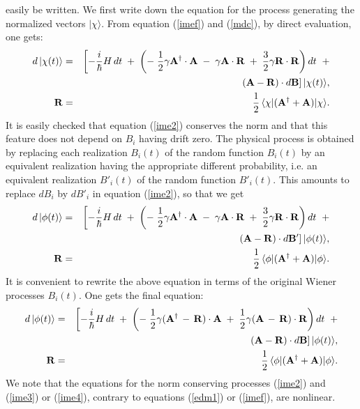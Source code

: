 \documentclass[12pt]{article}
\begin{document}
easily be written. We first write down the equation for the
process generating the normalized vectors $| \chi\rangle$. From
equation (\ref{imef}) and (\ref{mdc}), by direct evaluation, one
gets:
\begin{eqnarray} \label{ime2}
d\, |\chi(t)\rangle & = & \left[ -\frac{i}{\hbar} H\, dt \; + \;
\left( - \; \frac{1}{2}\gamma {\bf A}^{\dagger}\cdot {\bf A} \; -
\; \gamma {\bf A}\cdot {\bf R} \; + \; \frac{3}{2} \gamma {\bf R}
\cdot {\bf R} \right) dt \right. \; + \nonumber \\
&  & \left. ( {\bf A} - {\bf R})\cdot d{\bf B} \right]
|\chi(t)\rangle, \\
{\bf R} & = & \frac{1}{2}\, \langle \chi|({\bf A}^{\dagger} + {\bf
A}) |\chi \rangle. \nonumber
\end{eqnarray}
It is easily checked that equation (\ref{ime2}) conserves the norm
and that this feature does not depend on $B_{i}$ having drift
zero. The physical process is obtained by replacing each
realization $B_{i}(t)$ of the random function $B_{i}(t)$ by an
equivalent realization having the appropriate different
probability, i.e. an equivalent realization $B'_{i}(t)$ of the
random function $B'_{i}(t)$. This amounts to replace $dB_{i}$ by
$dB'_{i}$ in equation (\ref{ime2}), so that we get
\begin{eqnarray} \label{ime3}
d\, |\phi(t)\rangle & = & \left[ -\frac{i}{\hbar} H\, dt \; + \;
\left( - \; \frac{1}{2}\gamma {\bf A}^{\dagger}\cdot {\bf A} \; -
\; \gamma {\bf A}\cdot {\bf R} \; + \; \frac{3}{2} \gamma {\bf R}
\cdot {\bf R} \right) dt \right. \; + \nonumber \\
&  & \left. ( {\bf A} - {\bf R})\cdot d{\bf B}' \right]
|\phi(t)\rangle, \\
{\bf R} & = & \frac{1}{2}\, \langle \phi|({\bf A}^{\dagger} + {\bf
A}) |\phi \rangle. \nonumber
\end{eqnarray}
It is convenient to rewrite the above equation in terms of the
original Wiener processes $B_{i}(t)$. One gets the final equation:
\begin{eqnarray} \label{ime4}
d\, |\phi(t)\rangle & = & \left[ -\frac{i}{\hbar} H\, dt \; + \;
\left( - \; \frac{1}{2}\gamma ({\bf A}^{\dagger} \, - \, {\bf
R})\cdot {\bf A} \; + \; \frac{1}{2}\gamma ({\bf A} \, - \,
{\bf R})\cdot {\bf R} \right) dt \right. \; + \nonumber \\
&  & \left. ( {\bf A} - {\bf R})\cdot d{\bf B} \right]
|\phi(t)\rangle, \\
{\bf R} & = & \frac{1}{2}\, \langle \phi|({\bf A}^{\dagger} + {\bf
A}) |\phi \rangle. \nonumber
\end{eqnarray}
We note that the equations for the norm conserving processes
(\ref{ime2}) and (\ref{ime3}) or (\ref{ime4}), contrary to
equations (\ref{edm1}) or (\ref{imef}), are nonlinear.
\end{document}
